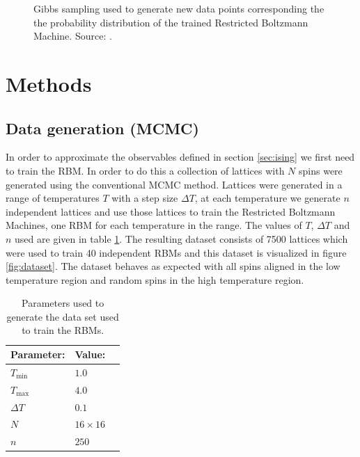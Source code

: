 \documentclass[10 pt, a4paper]{article}
\begin{document}
\begin{figure}[H] 
\centering
{}
\caption{Gibbs sampling used to generate new data points corresponding the the probability distribution of the trained Restricted Boltzmann Machine. Source: \cite{RBM}.}
\label{fig:GibbSample}
\end{figure}


\section{Methods} \label{sec:methods}

\subsection{Data generation (MCMC)}

In order to approximate the observables defined in section \ref{sec:ising} we first need to train the RBM. In order to do this a collection of lattices with $N$ spins were generated using the conventional MCMC method. Lattices were generated in a range of temperatures $T$ with a step size $\Delta T$, at each temperature we generate $n$ independent lattices and use those lattices to train the Restricted Boltzmann Machines, one RBM for each temperature in the range. The values of $T$, $\Delta T$ and $n$ used are given in table \ref{tab:MCMCparam}. The resulting dataset consists of 7500 lattices which were used to train 40 independent RBMs and this dataset is visualized in figure \ref{fig:dataset}. The dataset behaves as expected with all spins aligned in the low temperature region and random spins in the high temperature region.

\begin{table}[H] 
\centering
\caption{Parameters used to generate the data set used to train the RBMs.}
\begin{tabular}{l|ll}
Parameter: & Value: &  \\ 
\hline \hline
$T_\mathrm{min}$     & $1.0$                    \\
$T_\mathrm{max}$     & $4.0$                        \\
$\Delta T$    & $0.1$                        \\
$N$     & $16 \times 16$                       \\
$n$     & $250$                         \\  
\end{tabular}
\label{tab:MCMCparam}
\end{table}
\end{document}
